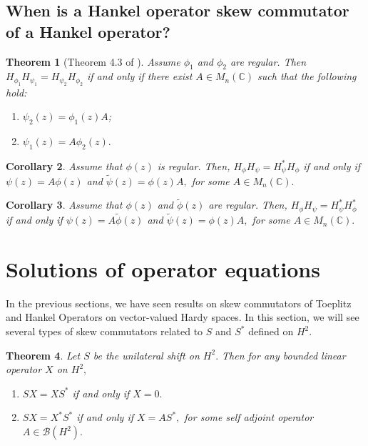 \documentclass[12pt, reqno]{amsart}
\newtheorem{theorem}{Theorem}[section]
\newtheorem{corollary}[theorem]{Corollary}
\theoremstyle{definition}
\theoremstyle{remark}
\numberwithin{equation}{section}
\begin{document}
    \subsection{When is a Hankel operator skew commutator of a Hankel operator?}
    \begin{theorem}[Theorem 4.3 of \cite{CG}]
        Assume $\phi_1$ and $\phi_2$ are regular. Then $H_{\phi_1}H_{\psi_1}=H_{\psi_2}H_{\phi_2}$ if and only if there exist $A \in M_n(\mathbb{C})$ such that the following hold:
        \begin{enumerate}
            \item $\psi_2(z)=\phi_1(z)A$;
            \item $\psi_1(z)=A\phi_2(z).$
        \end{enumerate}
    \end{theorem}
    \begin{corollary}
         Assume that $\phi(z)$ is regular. Then, $H_\phi H_\psi=H^*_\psi H_\phi$ if and only if $\psi(z)=A\phi(z)$ and $\tilde \psi(z)=\phi(z)A,$ for some $A \in M_n(\mathbb{C}).$
    \end{corollary}
    \begin{corollary}
        Assume that $\phi(z)$ and $\tilde \phi(z)$ are regular. Then, $H_\phi H_\psi=H^*_\psi H^*_\phi$ if and only if $\psi(z)=A\tilde \phi(z)$ and $\tilde \psi(z)=\phi(z)A,$ for some $A \in M_n(\mathbb{C}).$
    \end{corollary}
    \section{Solutions of operator equations}\label{section solutions of op eq}
    In the previous sections, we have seen results on skew commutators of Toeplitz and Hankel Operators on vector-valued Hardy spaces. In this section, we will see several types of skew commutators related to $S$ and $S^*$ defined on $H^2$.
        \begin{theorem}\label{th1}
            Let $S$ be the unilateral shift on $H^2.$ Then for any bounded linear operator $X$ on $H^2,$
            \begin{enumerate}
                \item  $SX=XS^*$ if and only if $X=0.$\label{p-1}
                \item $SX=X^*S^*$ if and only if $X=AS^*,$ for some self adjoint operator $A \in \mathcal{B}(H^2).$\label{p-2}
            \end{enumerate}
        \end{theorem}
    
\end{document}
